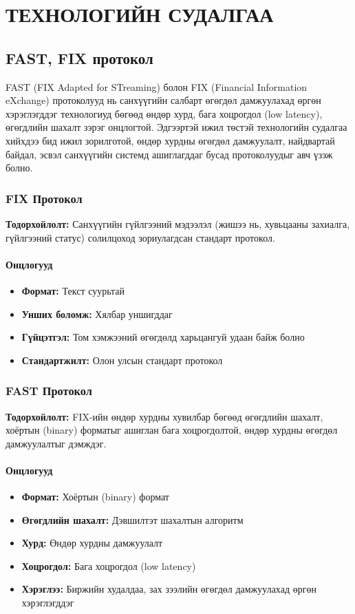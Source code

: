 \documentclass[12pt,A4]{report}
\begin{document}
\chapter{ТЕХНОЛОГИЙН СУДАЛГАА}
\section{FAST, FIX протокол}

FAST (FIX Adapted for STreaming) болон FIX (Financial Information eXchange) протоколууд нь санхүүгийн салбарт өгөгдөл дамжуулахад өргөн хэрэглэгддэг технологиуд бөгөөд өндөр хурд, бага хоцрогдол (low latency), өгөгдлийн шахалт зэрэг онцлогтой. Эдгээртэй ижил төстэй технологийн судалгаа хийхдээ бид ижил зорилготой, өндөр хурдны өгөгдөл дамжуулалт, найдвартай байдал, эсвэл санхүүгийн системд ашиглагддаг бусад протоколуудыг авч үзэж болно.

\subsection{FIX Протокол}

{\textbf{Тодорхойлолт:}} Санхүүгийн гүйлгээний мэдээлэл (жишээ нь, хувьцааны захиалга, гүйлгээний статус) солилцоход зориулагдсан стандарт протокол.

\subsubsection{Онцлогууд}
\begin{itemize}
    \item \textbf{Формат:} Текст суурьтай
    \item \textbf{Унших боломж:} Хялбар уншигддаг
    \item \textbf{Гүйцэтгэл:} Том хэмжээний өгөгдөлд харьцангуй удаан байж болно
    \item \textbf{Стандартжилт:} Олон улсын стандарт протокол
\end{itemize}

\subsection{FAST Протокол}

{\textbf{Тодорхойлолт:}} FIX-ийн өндөр хурдны хувилбар бөгөөд өгөгдлийн шахалт, хоёртын (binary) форматыг ашиглан бага хоцрогдолтой, өндөр хурдны өгөгдөл дамжуулалтыг дэмждэг.

\subsubsection{Онцлогууд}
\begin{itemize}
    \item \textbf{Формат:} Хоёртын (binary) формат
    \item \textbf{Өгөгдлийн шахалт:} Дэвшилтэт шахалтын алгоритм
    \item \textbf{Хурд:} Өндөр хурдны дамжуулалт
    \item \textbf{Хоцрогдол:} Бага хоцрогдол (low latency)
    \item \textbf{Хэрэглээ:} Биржийн худалдаа, зах зээлийн өгөгдөл дамжуулахад өргөн хэрэглэгддэг
\end{itemize}
\end{document}
